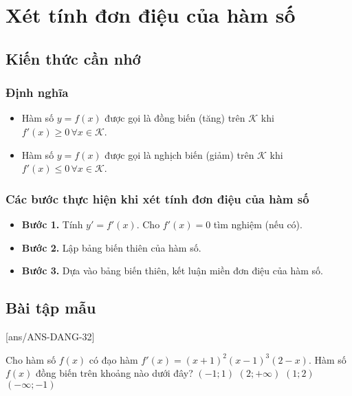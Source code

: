 \setcounter{section}{31}
\setcounter{ex}{0}
\section{Xét tính đơn điệu của hàm số}
\subsection{Kiến thức cần nhớ}
\begin{khung}
	\subsubsection{Định nghĩa}
	\begin{itemize}
		\item Hàm số $y=f(x)$ được gọi là đồng biến (tăng) trên $\mathscr{K}$ khi $f'(x)\geq 0\, \forall x\in \mathscr{K}$.
		\item Hàm số $y=f(x)$ được gọi là nghịch biến (giảm) trên $\mathscr{K}$ khi $f'(x)\leq 0\, \forall x\in \mathscr{K}$.
	\end{itemize}
	\subsubsection{Các bước thực hiện khi xét tính đơn điệu của hàm số}
	\begin{itemize}
		\item {\bfseries Bước 1.} Tính $y'=f'(x)$. Cho $f'(x)=0$ tìm nghiệm (nếu có).
		\item {\bfseries Bước 2.} Lập bảng biến thiên của hàm số.
		\item {\bfseries Bước 3.} Dựa vào bảng biến thiên, kết luận miền đơn điệu của hàm số.
	\end{itemize}
\end{khung}
\subsection{Bài tập mẫu}
[ans/ANS-DANG-32]
\begin{khung}
\begin{vd}%
	Cho hàm số $f(x)$ có đạo hàm $f'(x)=\left(x+1\right)^2\left(x-1\right)^3\left(2-x\right)$. Hàm số $f(x)$ đồng biến trên khoảng nào dưới đây?
	\choice
	{$\left(-1; 1\right)$}
	{$\left(2; +\infty\right)$}
	{\True $\left(1; 2\right)$}
	{$\left(-\infty; -1\right)$}
\end{vd}
\end{khung}
